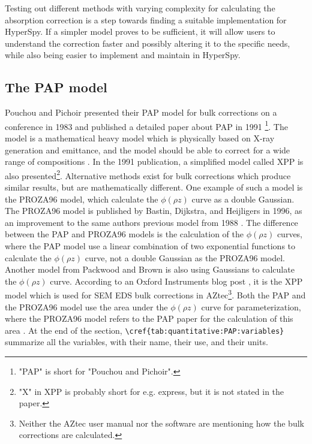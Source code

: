 Testing out different methods with varying complexity for calculating the absorption correction is a step towards finding a suitable implementation for HyperSpy.
If a simpler model proves to be sufficient, it will allow users to understand the correction faster and possibly altering it to the specific needs, while also being easier to implement and maintain in HyperSpy.












\subsection{The PAP model}
\label{theory:quantitative:pap}

Pouchou and Pichoir presented their PAP model for bulk corrections on a conference in 1983 and published a detailed paper about PAP in 1991 \cite{pap_1991}\footnote{"PAP" is short for "Pouchou and Pichoir".}.
The model is a mathematical heavy model which is physically based on X-ray generation and emittance, and the model should be able to correct for a wide range of compositions \cite{pap_1991}.
In the 1991 publication, a simplified model called XPP is also presented\footnote{"X" in XPP is probably short for e.g. express, but it is not stated in the paper.}.
Alternative methods exist for bulk corrections which produce similar results, but are mathematically different.
One example of such a model is the PROZA96 model, which calculate the $\phi(\rho z)$ curve as a double Gaussian.
The PROZA96 model is published by Bastin, Dijkstra, and Heijligers in 1996, as an improvement to the same authors previous model from 1988 \cite{bastin_proza96_1998,bastin_proza_1988}.
The difference between the PAP and PROZA96 models is the calculation of the $\phi(\rho z)$ curves, where the PAP model use a linear combination of two exponential functions to calculate the $\phi(\rho z)$ curve, not a double Gaussian as the PROZA96 model.
Another model from Packwood and Brown \cite{packwood_1981} is also using Gaussians to calculate the $\phi(\rho z)$ curve.
According to an Oxford Instruments blog post \cite{oxford_blog_XPP}, it is the XPP model which is used for SEM EDS bulk corrections in AZtec\footnote{Neither the AZtec user manual nor the software \cite{aztec_manual} are mentioning how the bulk corrections are calculated.}.
Both the PAP and the PROZA96 model use the area under the $\phi(\rho z)$ curve for parameterization, where the PROZA96 model refers to the PAP paper for the calculation of this area \cite{bastin_proza96_1998}.
At the end of the section, \verb|\cref{tab:quantitative:PAP:variables}| summarize all the variables, with their name, their use, and their units.



